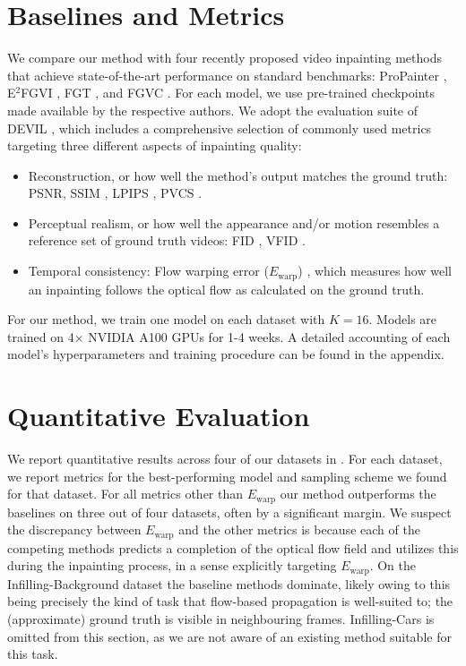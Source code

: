 \section{Baselines and Metrics} 
We compare our method with four recently proposed video inpainting methods that achieve state-of-the-art performance on standard benchmarks: ProPainter \citep{propainter}, E$^2$FGVI \citep{endtoend}, FGT \citep{fgt}, and FGVC \citep{flowedgeguided}. For each model, we use pre-trained checkpoints made available by the respective authors. We adopt the evaluation suite of DEVIL \citep{devil}, which includes a comprehensive selection of commonly used metrics targeting three different aspects of inpainting quality:
\begin{itemize}
    \item Reconstruction, or how well the method's output matches the ground truth: PSNR, SSIM \citep{ssim}, LPIPS \citep{lpips}, PVCS \citep{devil}. 
    \item Perceptual realism, or how well the appearance and/or motion resembles a reference set of ground truth videos: FID \citep{fid}, VFID \citep{vfid}.
    \item Temporal consistency: Flow warping error ($E_\text{warp}$) \citep{ewarp}, which measures how well an inpainting follows the optical flow as calculated on the ground truth. 
\end{itemize} 
For our method, we train one model on each dataset with $K=16$. Models are trained on 4$\times$ NVIDIA A100 GPUs for 1-4 weeks. A detailed accounting of each model's hyperparameters and training procedure can be found in the appendix.

\section{Quantitative Evaluation}
We report quantitative results across four of our datasets in . For each dataset, we report metrics for the best-performing model and sampling scheme we found for that dataset. For all metrics other than $E_\text{warp}$ our method outperforms the baselines on three out of four datasets, often by a significant margin. We suspect the discrepancy between $E_\text{warp}$ and the other metrics is because each of the competing methods predicts a completion of the optical flow field and utilizes this during the inpainting process, in a sense explicitly targeting $E_\text{warp}$. On the Infilling-Background dataset the baseline methods dominate, likely owing to this being precisely the kind of task that flow-based propagation is well-suited to; the (approximate) ground truth is visible in neighbouring frames. Infilling-Cars is omitted from this section, as we are not aware of an existing method suitable for this task. 
